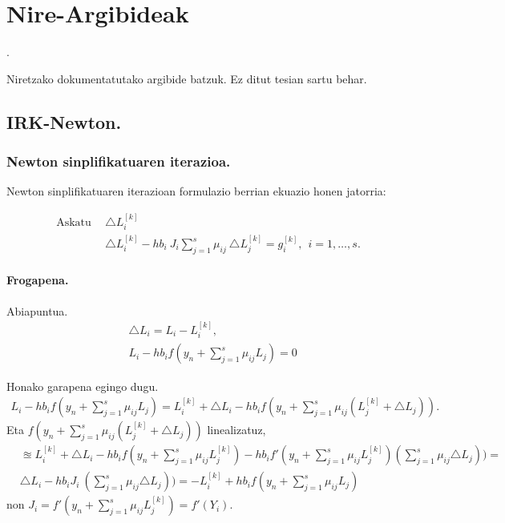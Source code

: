 \chapter{Nire-Argibideak}.

Niretzako dokumentatutako argibide batzuk. Ez ditut tesian sartu behar.

\section{IRK-Newton.}

\subsection*{Newton sinplifikatuaren iterazioa.}
Newton sinplifikatuaren iterazioan formulazio berrian ekuazio honen jatorria:

\begin{align*}
\mbox{Askatu} \ \ & \triangle L_i^{[k]} \\
\ \ &\triangle L_i^{[k]} - h b_i \ J_i \sum_{j=1}^{s} \mu_{ij}  \ \triangle L_j^{[k]} = g_i^{[k]}  , \ \ i=1,\dots,s.
\end{align*}

\subsubsection*{Frogapena.}

Abiapuntua.
\begin{align*}
& \triangle L_i=L_i-L_i^{[k]},\\
& L_i-h b_i f(y_n+\sum_{j=1}^{s} \mu_{ij}L_j)=0
\end{align*}

Honako garapena egingo dugu.
\begin{align*}
L_i-h b_i f(y_n+\sum_{j=1}^{s} \mu_{ij}L_j)= L_i^{[k]}+\triangle L_i-h b_i f(y_n+\sum_{j=1}^{s} \mu_{ij} (L_j^{[k]}+\triangle L_j)).
\end{align*}
Eta $f(y_n+\sum_{j=1}^{s} \mu_{ij} (L_j^{[k]}+\triangle L_j))$ linealizatuz,
\begin{align*}
& \approxeq L_i^{[k]}+\triangle L_i-h b_i f(y_n+\sum_{j=1}^{s} \mu_{ij}L_j^{[k]})-h b_i f'(y_n+\sum_{j=1}^{s} \mu_{ij} L_j^{[k]}) (\sum_{j=1}^{s} \mu_{ij} \triangle L_j))= \\
& \triangle L_i- hb_i J_i \ (\sum_{j=1}^{s} \mu_{ij} \triangle L_j))= -L_i^{[k]}+h b_i f(y_n+\sum_{j=1}^{s} \mu_{ij}L_j)
\end{align*}
non $J_i=f'(y_n+\sum_{j=1}^{s} \mu_{ij} L_j^{[k]})=f'(Y_i)$.

